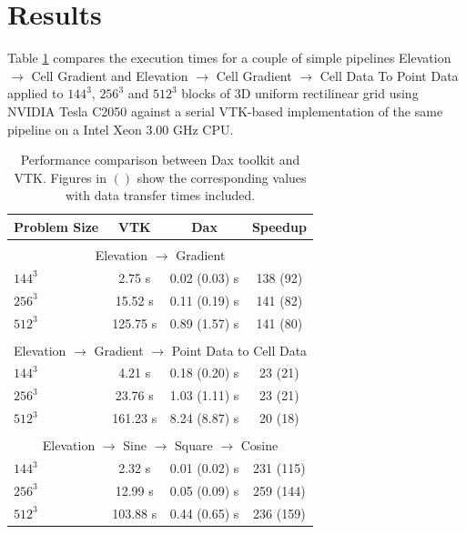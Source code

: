 \documentclass{vgtc}                          %
\begin{document}
\section{Results}
\label{sec:Results}

Table \ref{tab:Results} compares the execution times for a couple of simple
pipelines Elevation $\rightarrow$ Cell Gradient and Elevation $\rightarrow$
Cell Gradient $\rightarrow$ Cell Data To Point Data applied to $144^3$, $256^3$
and $512^3$ blocks of 3D uniform
rectilinear grid using NVIDIA Tesla C2050 against a serial VTK-based
implementation of the same pipeline on a Intel Xeon 3.00 GHz CPU.

\begin{table}[htbp]
  \centering
  \caption{Performance comparison between Dax toolkit and VTK. Figures in
    $( )$ show the corresponding values with data transfer times
      included.}
  \label{tab:Results}
  \vspace{6pt}
  \begin{tabular}{lccc}
    Problem Size& VTK & Dax & Speedup \\
    \hline
    \\
    \multicolumn{4}{c}{Elevation $\rightarrow$ Gradient} \\
    \hline
    $144^3$ & 2.75 s & 0.02 (0.03) s & 138 (92) \\
    $256^3$ &  15.52 s & 0.11 (0.19) s & 141 (82) \\
    $512^3$ &  125.75 s & 0.89 (1.57) s &  141 (80) \\
    \\
    \multicolumn{4}{c}{Elevation $\rightarrow$ Gradient $\rightarrow$ Point Data to Cell Data} \\
    \hline
    $144^3$ & 4.21 s & 0.18 (0.20) s &  23 (21) \\
    $256^3$ &  23.76 s & 1.03 (1.11) s & 23 (21) \\
    $512^3$ & 161.23 s & 8.24 (8.87) s &  20 (18) \\

    \\
    \multicolumn{4}{c}{Elevation $\rightarrow$ Sine $\rightarrow$ Square $\rightarrow$ Cosine} \\
    \hline
    $144^3$ & 2.32 s & 0.01 (0.02) s &  231 (115) \\
    $256^3$ &  12.99 s & 0.05 (0.09) s & 259 (144) \\
    $512^3$ & 103.88 s & 0.44 (0.65) s &  236 (159) \\
  \end{tabular}
\end{table}
\end{document}
